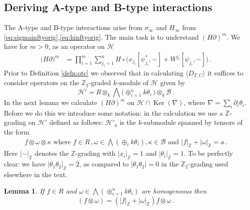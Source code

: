 \documentclass[english,letter paper,12pt,leqno]{article}
\newtheorem{lemma}[theorem]{Lemma}
\theoremstyle{example}
\numberwithin{equation}{section}
\def\Ker{\operatorname{Ker}}
\def\be{\begin{equation}}
\def\ee{\end{equation}}
\def\nZ{\mathds{Z}}
\begin{document}
\subsection{Deriving A-type and B-type interactions}

The A-type and B-type interactions arise from $\sigma_\infty$ and $H_\infty$ from \eqref{eq:sigmainftyorig},\eqref{eq:hinftyorig}. The main task is to understand $(H \partial)^m$. We have for $m > 0$, as an operator on $\mathscr{H}$
\begin{align*}
\big( H \partial )^m &= \prod_{i=1}^m \sum_{j_i = 1}^n H \circ \Big( x_{j_i} [\psi_{j_i}^*,-] + W^{j_i} [\psi_{j_i},-] \Big)\,.
\end{align*}
Prior to Definition \ref{defn:otc} we observed that in calculating $\langle D_{T,C} \rangle$ it suffices to consider operators on the $\nZ_2$-graded $k$-module of $\mathscr{H}$ given by
\be
\mathscr{H}' = R \otimes_k \bigwedge\big( \oplus_{i=1}^n k \theta_i \,\big) \otimes_k \mathscr{B}\,.
\ee
In the next lemma we calculate $(H \partial)^m$ on $\mathscr{H} \cap \Ker(\nabla)$, where $\nabla = \sum_i \partial_i \theta_i$. Before we do this we introduce some notation: in the calculation we use a $\nZ$-grading on $\mathscr{H}'$ defined as follows: $\mathscr{H}'_a$ is the $k$-submodule spanned by tensors of the form
\begin{align*}
f \otimes \omega \otimes \kappa \text{ where } f \in R\,, \omega \in \bigwedge( \oplus_i k \theta_i ), \kappa \in \mathscr{B} \text{ and } |f|_{\nZ} + |\omega|_{\nZ} = a\,.
\end{align*}
Here $|-|_{\nZ}$ denotes the $\nZ$-grading with $|x_i|_{\nZ} = 1$ and $|\theta_i|_{\nZ} = 1$. To be perfectly clear: we have $|\theta_1 \theta_2|_{\nZ} = 2$, as compared to $| \theta_1 \theta_2 | = 0$ in the $\nZ_2$-grading used elsewhere in the text.

\begin{lemma}\label{lemma:commutator_numberop} If $f \in R$ and $\omega \in \bigwedge( \oplus_{i=1}^n k \theta_i )$ are homogeneous then
\be
[d_K, \nabla]( f \otimes \omega ) = ( |f|_{\nZ} + |\omega|_{\nZ} ) f \otimes \omega\,.
\ee
\end{lemma}
\end{document}
